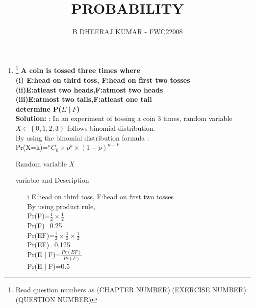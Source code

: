 \documentclass{article}
\providecommand{\cbrak}[1]{\ensuremath{\left\{#1\right\}}}
\newcommand{\solution}{\noindent \textbf{Solution: }}
\begin{document}
\title{PROBABILITY}
\author{\Large B DHEERAJ KUMAR - FWC22008}
\date{}

\maketitle
\begin{enumerate}[label=13.\arabic{enumi}.\arabic{enumii}]%
\setcounter{enumi}{0}
\setcounter{enumii}{6}

\item \footnote{Read question numbers as (CHAPTER NUMBER).(EXERCISE NUMBER).(QUESTION NUMBER)}
\textbf {A coin is tossed three times where \\
(i) E:head on third toss, F:head on first two tosses\\
(ii)E:atleast two heads,F:atmost two heads\\
(iii)E:atmost two tails,F:atleast one tail\\
determine P($E \mid F$) }\\[1ex]
\solution:
In an experiment of tossing a coin 3 times, random variable $X \in \cbrak{0,1,2,3}$ follows binomial distribution.\\
By using the binomial distribution formula :\\
Pr(X=k)=$^{n}C_k \times p^k \times (1-p)^{n-k}$\\
\vspace{5mm}
\begin{table}[h]
\centering

\caption{Random variable $X$}
\label{tab:5} 
\end{table}
\begin{table}[h]
\centering
	
\caption{variable and Description}
\label{tab:2} 
\end{table}
\begin{enumerate}
\item[i] E:head on third toss, F:head on first two tosses
\\
By using product rule,
\\
Pr(F)=$\frac{1}{2}\times\frac{1}{2}$\\
Pr(F)=0.25\\
Pr(EF)=$\frac{1}{2}\times\frac{1}{2}\times\frac{1}{2}$\\
Pr(EF)=0.125\\
Pr(E $\mid$ F)=$\frac{Pr(EF)}{Pr(F)}$\\
Pr(E $\mid$ F)=0.5\\
\end{enumerate}


\end{enumerate}
\end{document}
